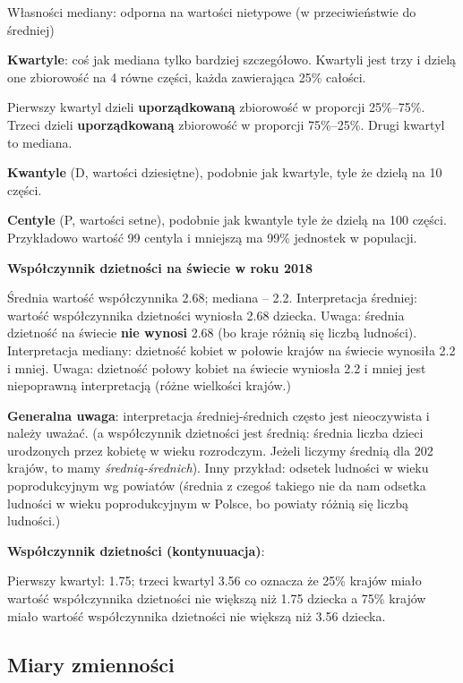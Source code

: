 \documentclass[
  openany]{book}
\begin{document}
Własności mediany: odporna na wartości nietypowe (w przeciwieństwie do średniej)

\textbf{Kwartyle}: coś jak mediana tylko bardziej szczegółowo. Kwartyli jest trzy i dzielą
one zbiorowość na 4 równe części, każda zawierająca 25\% całości.

Pierwszy kwartyl dzieli \textbf{uporządkowaną} zbiorowość w proporcji 25\%--75\%.
Trzeci dzieli \textbf{uporządkowaną} zbiorowość w proporcji 75\%--25\%.
Drugi kwartyl to mediana.

\textbf{Kwantyle} (D, wartości dziesiętne), podobnie jak kwartyle, tyle że dzielą na 10 części.

\textbf{Centyle} (P, wartości setne), podobnie jak kwantyle tyle że dzielą na 100 części.
Przykładowo wartość 99 centyla i mniejszą ma 99\% jednostek w populacji.

\begin{example}
\textbf{Współczynnik dzietności na świecie w roku 2018}

Średnia wartość współczynnika 2.68; mediana -- 2.2.
Interpretacja średniej:
wartość współczynnika dzietności wyniosła 2.68 dziecka. Uwaga:
średnia dzietność na świecie \textbf{nie wynosi} 2.68
(bo kraje różnią się liczbą ludności).
Interpretacja mediany: dzietność kobiet w połowie krajów na świecie
wynosiła 2.2 i mniej. Uwaga: dzietność połowy kobiet na świecie wyniosła
2.2 i mniej jest niepoprawną interpretacją (różne wielkości krajów.)
\end{example}

\textbf{Generalna uwaga}: interpretacja średniej-średnich często jest nieoczywista i należy uważać.
(a współczynnik dzietności jest średnią: średnia liczba dzieci urodzonych przez kobietę
w wieku rozrodczym. Jeżeli liczymy średnią dla 202 krajów, to mamy \emph{średnią-średnich}).
Inny przykład: odsetek ludności w wieku poprodukcyjnym wg powiatów (średnia z czegoś takiego
nie da nam odsetka ludności w wieku poprodukcyjnym w Polsce,
bo powiaty różnią się liczbą ludności.)

\begin{example}
\textbf{Współczynnik dzietności (kontynuuacja)}:

Pierwszy kwartyl: 1.75; trzeci kwartyl 3.56 co oznacza że
25\% krajów miało wartość współczynnika dzietności nie większą niż 1.75 dziecka
a 75\% krajów miało wartość współczynnika dzietności
nie większą niż 3.56 dziecka.
\end{example}

\hypertarget{miary-zmiennoux15bci}{%
\subsection{Miary zmienności}\label{miary-zmiennoux15bci}}
\end{document}
